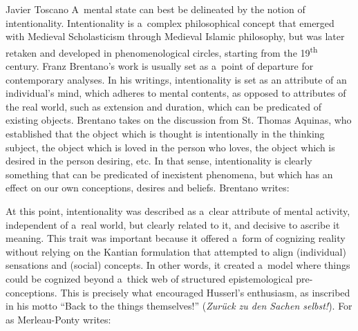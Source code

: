 \begin{artengenv}{Javier Toscano}
A~mental state can best be delineated by the notion of intentionality. Intentionality is a~complex philosophical concept that emerged with Medieval Scholasticism through Medieval Islamic philosophy, but was later retaken and developed in phenomenological circles, starting from the 19\textsuperscript{th} century. Franz Brentano's work is usually set as a~point of departure for contemporary analyses. In his writings, intentionality is set as an attribute of an individual's mind, which adheres to mental contents, as opposed to attributes of the real world, such as extension and duration, which can be predicated of existing objects. Brentano takes on the discussion from St. Thomas Aquinas, who established that the object which is thought is intentionally in the thinking subject, the object which is loved in the person who loves, the object which is desired in the person desiring, etc. In that sense, intentionality is clearly something that can be predicated of inexistent phenomena, but which has an effect on our own conceptions, desires and beliefs. Brentano
\parencite*[][p.68]{brentano_psychology_1995} %
 writes:

At this point, intentionality was described as a~clear attribute of mental activity, independent of a~real world, but clearly related to it, and decisive to ascribe it meaning. This trait was important because it offered a~form of cognizing reality without relying on the Kantian formulation that attempted to align (individual) sensations and (social) concepts. In other words, it created a~model where things could be cognized beyond a~thick web of structured epistemological pre-conceptions. This is precisely what encouraged Husserl's enthusiasm, as inscribed in his motto ``Back to the things themselves!'' (\textit{Zurück zu den Sachen selbst!}). For as Merleau-Ponty
\parencite*[][p.xix]{merleau-ponty_phenomenology_2005} %
 writes:


\end{artengenv}
